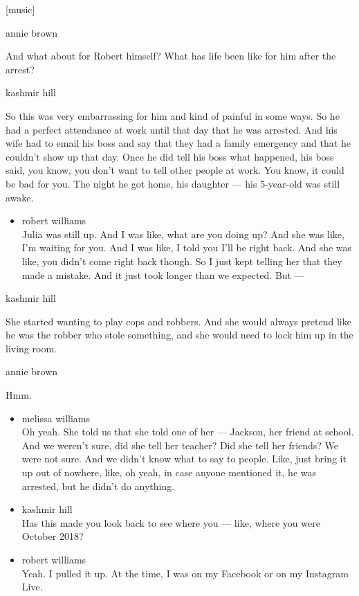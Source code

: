 {[}music{]}

annie brown

And what about for Robert himself? What has life been like for him after
the arrest?

kashmir hill

So this was very embarrassing for him and kind of painful in some ways.
So he had a perfect attendance at work until that day that he was
arrested. And his wife had to email his boss and say that they had a
family emergency and that he couldn't show up that day. Once he did tell
his boss what happened, his boss said, you know, you don't want to tell
other people at work. You know, it could be bad for you. The night he
got home, his daughter --- his 5-year-old was still awake.

\begin{itemize}
\tightlist
\item
  robert williams\\
  Julia was still up. And I was like, what are you doing up? And she was
  like, I'm waiting for you. And I was like, I told you I'll be right
  back. And she was like, you didn't come right back though. So I just
  kept telling her that they made a mistake. And it just took longer
  than we expected. But ---
\end{itemize}

kashmir hill

She started wanting to play cops and robbers. And she would always
pretend like he was the robber who stole something, and she would need
to lock him up in the living room.

annie brown

Hmm.

\begin{itemize}
\item
  melissa williams\\
  Oh yeah. She told us that she told one of her --- Jackson, her friend
  at school. And we weren't sure, did she tell her teacher? Did she tell
  her friends? We were not sure. And we didn't know what to say to
  people. Like, just bring it up out of nowhere, like, oh yeah, in case
  anyone mentioned it, he was arrested, but he didn't do anything.
\item
  kashmir hill\\
  Has this made you look back to see where you --- like, where you were
  October 2018?
\item
  robert williams\\
  Yeah. I pulled it up. At the time, I was on my Facebook or on my
  Instagram Live.
\end{itemize}

